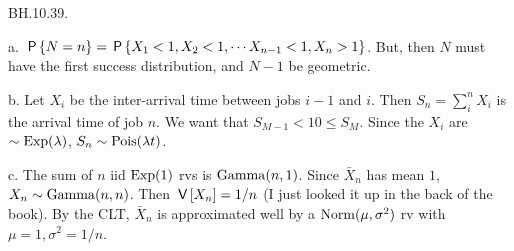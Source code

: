 \begin{exercise}
BH.10.39.
\begin{solution}
a.
 $\P{N=n} = \P{X_1 < 1, X_2<1, \cdots X_{n-1}<1, X_n>1}$. But, then $N$ must have the  first success distribution, and $N-1$ be geometric.


b.
Let $X_i$ be the inter-arrival time between jobs $i-1$ and $i$. Then $S_n=\sum_i^n X_i$ is the arrival time of job $n$. We want that $S_{M-1} < 10 \leq S_M$. Since the $X_i$ are $\sim \Exp{\lambda}$, $S_n \sim \Pois{\lambda t}$.

c.  The sum of $n$ iid $\Exp{1}$ rvs is $\Gamm{n,1}$. Since $\bar X_{n}$ has mean $1$, $X_{n} \sim \Gamm{n,n}$. Then $\V{X_n} = 1/n$ (I just looked it up in the back of the book).  By the CLT, $\bar X_n$ is approximated well by a $\Norm{\mu, \sigma^{2}}$ rv with $\mu=1, \sigma^2=1/n$.

\end{solution}
\end{exercise}





